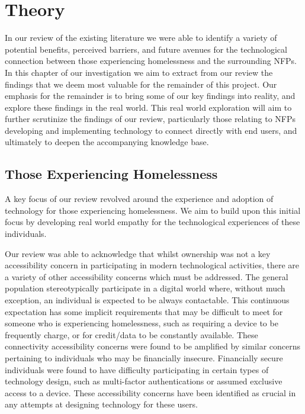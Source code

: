 \chapter{Theory}

In our review of the existing literature we were able to identify a variety of potential benefits, perceived barriers, and future avenues for the technological connection between those experiencing homelessness and the surrounding NFPs. In this chapter of our investigation we aim to extract from our review the findings that we deem most valuable for the remainder of this project. Our emphasis for the remainder is to bring some of our key findings into reality, and explore these findings in the real world. This real world exploration will aim to further scrutinize the findings of our review, particularly those relating to NFPs developing and implementing technology to connect directly with end users, and ultimately to deepen the accompanying knowledge base.

\section{Those Experiencing Homelessness}

A key focus of our review revolved around the experience and adoption of technology for those experiencing homelessness. We aim to build upon this initial focus by developing real world empathy for the technological experiences of these individuals.

Our review was able to acknowledge that whilst ownership was not a key accessibility concern in participating in modern technological activities, there are a variety of other accessibility concerns which must be addressed. The general population stereotypically participate in a digital world where, without much exception, an individual is expected to be always contactable. This continuous expectation has some implicit requirements that may be difficult to meet for someone who is experiencing homelessness, such as requiring a device to be frequently charge, or for credit/data to be constantly available. These connectivity accessibility concerns were found to be amplified by similar concerns pertaining to individuals who may be financially insecure. Financially secure individuals were found to have difficulty participating in certain types of technology design, such as multi-factor authentications or assumed exclusive access to a device. These accessibility concerns have been identified as crucial in any attempts at designing technology for these users.

